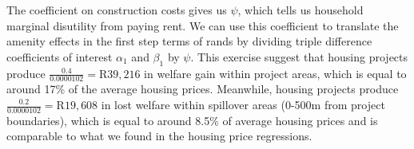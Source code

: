 \documentclass[12pt]{article}
\begin{document}
The coefficient on construction costs gives us $\psi$, which tells us household marginal disutility from paying rent.  We can use this coefficient to translate the amenity effects in the first step terms of rands by dividing triple difference coefficients of interest $\alpha_1$ and $\beta_1$ by $\psi$.  This exercise suggest that housing projects produce $\frac{0.4}{0.0000102} = \text{R}39,216$ in welfare gain within project areas, which is equal to around 17\% of the average housing prices.  Meanwhile, housing projects produce $\frac{0.2}{0.0000102} = \text{R}19,608$ in lost welfare within spillover areas (0-500m from project boundaries), which is equal to around 8.5\% of average housing prices and is comparable to what we found in the housing price regressions.










\end{document}
